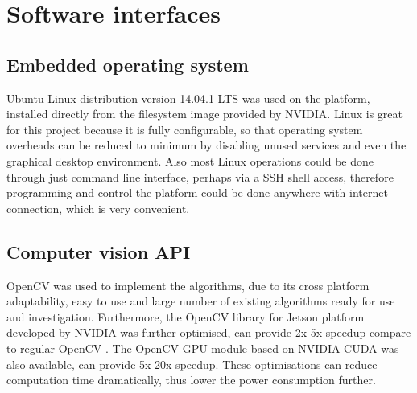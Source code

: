 \section{Software interfaces}

\subsection{Embedded operating system}

Ubuntu Linux distribution version 14.04.1 LTS was used on the platform, installed directly from the filesystem image provided by NVIDIA. Linux is great for this project because it is fully configurable, so that operating system overheads can be reduced to minimum by disabling unused services and even the graphical desktop environment. Also most Linux operations could be done through just command line interface, perhaps via a SSH shell access, therefore programming and control the platform could be done anywhere with internet connection, which is very convenient.

\subsection{Computer vision API}

OpenCV \cite{opencv} was used to implement the algorithms, due to its cross platform adaptability, easy to use and large number of existing algorithms ready for use and investigation. Furthermore, the OpenCV library for Jetson platform developed by NVIDIA was further optimised, can provide 2x-5x speedup compare to regular OpenCV \cite{NVIDIA:perf}. The OpenCV GPU module based on NVIDIA CUDA was also available, can provide 5x-20x speedup. These optimisations can reduce computation time dramatically, thus lower the power consumption further.
